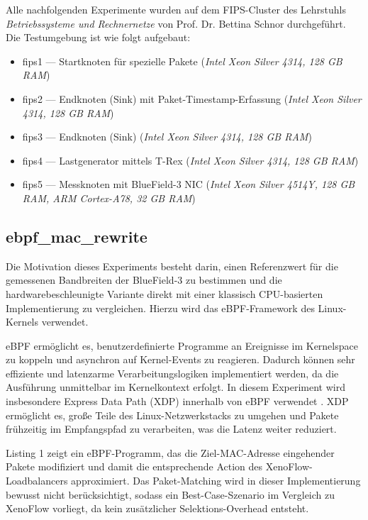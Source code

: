 \documentclass[paper=a4, fontsize=11pt]{scrartcl} %
\numberwithin{equation}{section} %
\numberwithin{figure}{section} %
\numberwithin{table}{section} %
\begin{document}
Alle nachfolgenden Experimente wurden auf dem FIPS-Cluster des Lehrstuhls \textit{Betriebssysteme und Rechnernetze} von Prof. Dr. Bettina Schnor durchgeführt. Die Testumgebung ist wie folgt aufgebaut:

\begin{itemize}
    \item fips1 — Startknoten für spezielle Pakete (\textit{Intel Xeon Silver 4314, 128 GB RAM})
    \item fips2 — Endknoten (Sink) mit Paket-Timestamp-Erfassung (\textit{Intel Xeon Silver 4314, 128 GB RAM})
    \item fips3 — Endknoten (Sink) (\textit{Intel Xeon Silver 4314, 128 GB RAM})
    \item fips4 — Lastgenerator mittels T-Rex (\textit{Intel Xeon Silver 4314, 128 GB RAM})
    \item fips5 — Messknoten mit BlueField-3 NIC (\textit{Intel Xeon Silver 4514Y, 128 GB RAM, ARM Cortex-A78, 32 GB RAM})
\end{itemize}

\subsection{ebpf\_mac\_rewrite}

Die Motivation dieses Experiments besteht darin, einen Referenzwert für die gemessenen Bandbreiten der BlueField-3 zu bestimmen und die hardwarebeschleunigte Variante direkt mit einer klassisch CPU-basierten Implementierung zu vergleichen. Hierzu wird das eBPF-Framework des Linux-Kernels verwendet.

eBPF ermöglicht es, benutzerdefinierte Programme an Ereignisse im Kernelspace zu koppeln und asynchron auf Kernel-Events zu reagieren. Dadurch können sehr effiziente und latenzarme Verarbeitungslogiken implementiert werden, da die Ausführung unmittelbar im Kernelkontext erfolgt. In diesem Experiment wird insbesondere Express Data Path (XDP) innerhalb von eBPF verwendet \cite{vieira2020ebpfxdp}. XDP ermöglicht es, große Teile des Linux-Netzwerkstacks zu umgehen und Pakete frühzeitig im Empfangspfad zu verarbeiten, was die Latenz weiter reduziert.

Listing 1 zeigt ein eBPF-Programm, das die Ziel-MAC-Adresse eingehender Pakete modifiziert und damit die entsprechende Action des XenoFlow-Loadbalancers approximiert. Das Paket-Matching wird in dieser Implementierung bewusst nicht berücksichtigt, sodass ein Best-Case-Szenario im Vergleich zu XenoFlow vorliegt, da kein zusätzlicher Selektions-Overhead entsteht.
\end{document}
